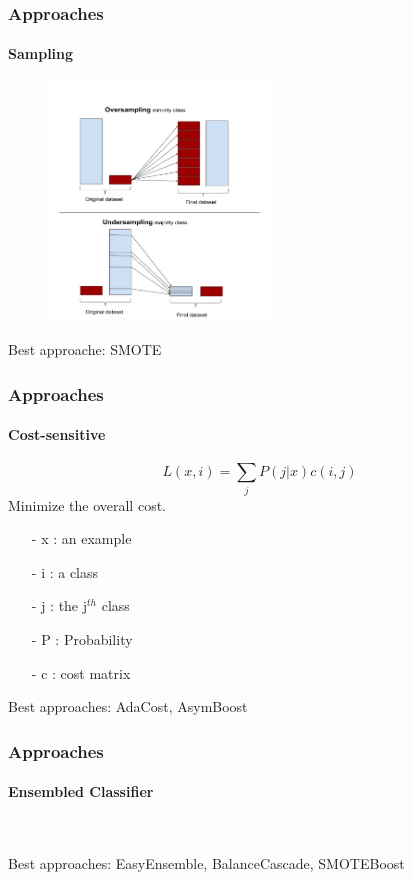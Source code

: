 \documentclass[11 pt,t]{beamer}
\begin{document}
\begin{frame}
\frametitle{Approaches}
\framesubtitle{Sampling}
\begin{minipage}[t]{\linewidth}\centering
\begin{figure}
   \includegraphics[width=6cm]{sampling}
\end{figure}
\end{minipage}
{\textcolor{tangocolordarkscarletred}{Best approache: SMOTE}}
\end{frame}

\begin{frame}
\frametitle{Approaches}
\framesubtitle{Cost-sensitive}
\begin{displaymath}
L(x,i) = \sum_{j}P(j|x)c(i,j)
\end{displaymath}
Minimize the overall cost.
\begin{itemize}
\item[-] x : an example
\item[-] i : a class
\item[-] j : the j$^{th}$ class
\item[-] P : Probability
\item[-] c : cost matrix
\end{itemize}
{\textcolor{tangocolordarkscarletred}{Best approaches: AdaCost, AsymBoost}}
\end{frame}

\begin{frame}
\frametitle{Approaches}
\framesubtitle{Ensembled Classifier}

\begin{center}
\\
\end{center}
{\textcolor{tangocolordarkscarletred}{Best approaches: EasyEnsemble, BalanceCascade, SMOTEBoost}}
\end{frame}
\end{document}
